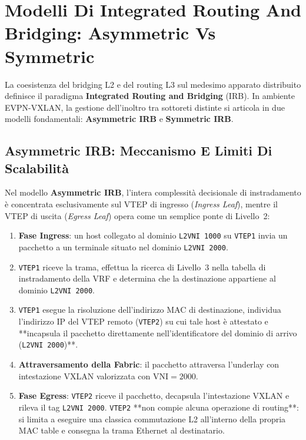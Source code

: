 \documentclass[11pt, a4paper]{article}
\begin{document}
\newpage

\section{Modelli Di Integrated Routing And Bridging: Asymmetric Vs Symmetric}

La coesistenza del bridging L2 e del routing L3 sul medesimo apparato distribuito definisce il paradigma \textbf{Integrated Routing and Bridging} (IRB). In ambiente EVPN-VXLAN, la gestione dell'inoltro tra sottoreti distinte si articola in due modelli fondamentali: \textbf{Asymmetric IRB} e \textbf{Symmetric IRB}.

\subsection{Asymmetric IRB: Meccanismo E Limiti Di Scalabilità}

Nel modello \textbf{Asymmetric IRB}, l'intera complessità decisionale di instradamento è concentrata esclusivamente sul VTEP di ingresso (\emph{Ingress Leaf}), mentre il VTEP di uscita (\emph{Egress Leaf}) opera come un semplice ponte di Livello~2:


\begin{enumerate}
    \item \textbf{Fase Ingress}: un host collegato al dominio \texttt{L2VNI 1000} su \texttt{VTEP1} invia un pacchetto a un terminale situato nel dominio \texttt{L2VNI 2000}.
    \item \texttt{VTEP1} riceve la trama, effettua la ricerca di Livello~3 nella tabella di instradamento della VRF e determina che la destinazione appartiene al dominio \texttt{L2VNI 2000}.
    \item \texttt{VTEP1} esegue la risoluzione dell'indirizzo MAC di destinazione, individua l'indirizzo IP del VTEP remoto (\texttt{VTEP2}) su cui tale host è attestato e **incapsula il pacchetto direttamente nell'identificatore del dominio di arrivo (\texttt{L2VNI 2000})**.
    \item \textbf{Attraversamento della Fabric}: il pacchetto attraversa l'underlay con intestazione VXLAN valorizzata con $\text{VNI} = 2000$.
    \item \textbf{Fase Egress}: \texttt{VTEP2} riceve il pacchetto, decapsula l'intestazione VXLAN e rileva il tag \texttt{L2VNI 2000}. \texttt{VTEP2} **non compie alcuna operazione di routing**: si limita a eseguire una classica commutazione L2 all'interno della propria MAC table e consegna la trama Ethernet al destinatario.
\end{enumerate}
\end{document}

